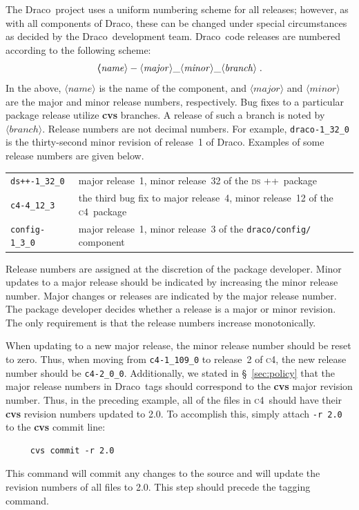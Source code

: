 \documentclass[11pt]{nmemo}
\newcommand{\draco}{{\normalfont\normalsize\textsf Draco}}
\newcommand{\cfour}{{\normalfont\normalsize\scshape c\small 4}}
\newcommand{\dsxx}{{\normalfont\normalsize\scshape ds\raisebox{.2ex}
  {\scriptsize ++}}}
\begin{document}
The \draco\ project uses a uniform numbering scheme for all releases;
however, as with all components of \draco, these can be changed under
special circumstances as decided by the \draco\ development team.
\draco\ code releases are numbered according to the following scheme:
\begin{equation}
  \boldsymbol
  \langle\mathit{name}\rangle-
  \langle\mathit{major}\rangle\_
  \langle\mathit{minor}\rangle\_
  \langle\mathit{branch}\rangle\; .
  \notag
\end{equation}
In the above, $\langle\mathit{name}\rangle$ is the name of the
component, and $\langle\mathit{major}\rangle$ and
$\langle\mathit{minor}\rangle$ are the major and minor release
numbers, respectively. Bug fixes to a particular package release utilize
{\bf cvs} branches.  A release of such a branch is noted by
$\langle\mathit{branch}\rangle$.  Release numbers are not decimal
numbers.  For example, \texttt{draco-1\_32\_0} is the thirty-second
minor revision of release~1 of \draco.  Examples of some release
numbers are given below.
\begin{center}
  \begin{tabular}{ll}
    \texttt{ds++-1\_32\_0} & major release~1, minor release~32 of the
    \dsxx\ package \\
    \texttt{c4-4\_12\_3} & the third bug fix to major release~4, minor
    release~12 of the \cfour\ package \\
    \texttt{config-1\_3\_0} & major release~1, minor release~3 of the
    \texttt{draco/config/} component\\
  \end{tabular}
\end{center}

Release numbers are assigned at the discretion of the package
developer.  Minor updates to a major release should be indicated by
increasing the minor release number.  Major changes or releases are
indicated by the major release number.  The package developer decides
whether a release is a major or minor revision.  The only requirement
is that the release numbers increase monotonically. 

When updating to a new major release, the minor release number should
be reset to zero.  Thus, when moving from \texttt{c4-1\_109\_0} to
release~2 of \cfour, the new release number should be
\texttt{c4-2\_0\_0}.  Additionally, we stated in \S~\ref{sec:policy}
that the major release numbers in \draco\ tags should correspond to
the {\bf cvs} major revision number.  Thus, in the preceding example,
all of the files in \cfour\ should have their {\bf cvs} revision
numbers updated to 2.0.  To accomplish this, simply attach \texttt{-r
  2.0} to the {\bf cvs} commit line:
\begin{verbatim}
     cvs commit -r 2.0
\end{verbatim}
This command will commit any changes to the source and will update 
the revision numbers of all files to 2.0.  This step should precede
the tagging command.
\end{document}
